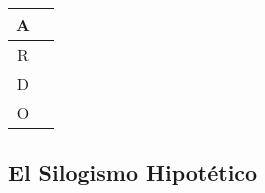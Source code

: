 \documentclass{article}
\begin{document}
\begin{itemize}
\begin{tabular}{|c|c|}
               \hline
               A & \hspace{10em} \\
               \hline
               R & \hspace{10em} \\
               \hline
               D & \hspace{10em} \\
               \hline
               O & \hspace{10em} \\
          \hline
          \end{tabular}
      \end{itemize}

\subsection{El Silogismo Hipotético}
\end{document}
